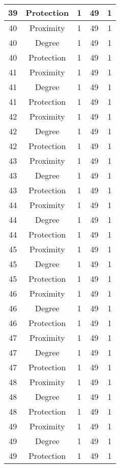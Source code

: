 \documentclass[results.tex]{subfiles}
\begin{document}
\begin{center}
\begin{tabular}{| c || c | c | c | c |}
    \hline
    39 & Protection & 1 & 49 & 1 \\ 
    \hline
    40 & Proximity & 1 & 49 & 1 \\ 
    \hline
    40 & Degree & 1 & 49 & 1 \\ 
    \hline
    40 & Protection & 1 & 49 & 1 \\ 
    \hline
    41 & Proximity & 1 & 49 & 1 \\ 
    \hline
    41 & Degree & 1 & 49 & 1 \\ 
    \hline
    41 & Protection & 1 & 49 & 1 \\ 
    \hline
    42 & Proximity & 1 & 49 & 1 \\ 
    \hline
    42 & Degree & 1 & 49 & 1 \\ 
    \hline
    42 & Protection & 1 & 49 & 1 \\ 
    \hline
    43 & Proximity & 1 & 49 & 1 \\ 
    \hline
    43 & Degree & 1 & 49 & 1 \\ 
    \hline
    43 & Protection & 1 & 49 & 1 \\ 
    \hline
    44 & Proximity & 1 & 49 & 1 \\ 
    \hline
    44 & Degree & 1 & 49 & 1 \\ 
    \hline
    44 & Protection & 1 & 49 & 1 \\ 
    \hline
    45 & Proximity & 1 & 49 & 1 \\ 
    \hline
    45 & Degree & 1 & 49 & 1 \\ 
    \hline
    45 & Protection & 1 & 49 & 1 \\ 
    \hline
    46 & Proximity & 1 & 49 & 1 \\ 
    \hline
    46 & Degree & 1 & 49 & 1 \\ 
    \hline
    46 & Protection & 1 & 49 & 1 \\ 
    \hline
    47 & Proximity & 1 & 49 & 1 \\ 
    \hline
    47 & Degree & 1 & 49 & 1 \\ 
    \hline
    47 & Protection & 1 & 49 & 1 \\ 
    \hline
    48 & Proximity & 1 & 49 & 1 \\ 
    \hline
    48 & Degree & 1 & 49 & 1 \\ 
    \hline
    48 & Protection & 1 & 49 & 1 \\ 
    \hline
    49 & Proximity & 1 & 49 & 1 \\ 
    \hline
    49 & Degree & 1 & 49 & 1 \\ 
    \hline
    49 & Protection & 1 & 49 & 1 \\ 
    \hline   \end{tabular}
\end{center}
\end{document}
